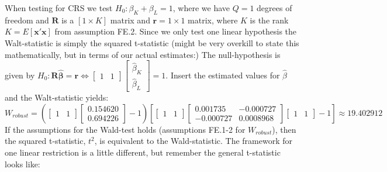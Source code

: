 When testing for CRS we test $H_0:\beta_K+\beta_L=1$, where we have $Q=1$ degrees of freedom and  $\mathbf{R}$ is a $[1 \times K]$ matrix and $\textbf{r}=1 \times 1$ matrix, where $K$ is the rank $K=E[\textbf{x}'\textbf{x}]$  from assumption FE.2. Since we only test one linear hypothesis the Walt-statistic is simply the squared t-statistic (might be very overkill to state this mathematically, but in terms of our actual estimates:)
The null-hypothesis is given by  $H_0: \mathbf{R}\boldsymbol{\hat{\beta}}=\mathbf{r}\Leftrightarrow \begin{bmatrix}1&1 \end{bmatrix} \begin{bmatrix}\hat{\beta}_K\\ \hat{\beta}_L \end{bmatrix}=1$. Insert the estimated values for $\hat{\beta}$ and the Walt-statistic yields:
\begin{equation*}
    W_{robust}= (\begin{bmatrix}1&1 \end{bmatrix} 
    \begin{bmatrix} 0.154620 \\ 0.694226 \end{bmatrix}-1)[\begin{bmatrix}1&1 \end{bmatrix}
    \begin{bmatrix}
        0.001735 & -0.000727 \\ 
        -0.000727 & 0.0008968
    \end{bmatrix} \begin{bmatrix}1&1 \end{bmatrix}-1]\approx 19.402912
\end{equation*}
If the assumptions for the Wald-test holds (assumptions FE.1-2 for $W_{robust}$), then the squared t-statistic, $t^2$, is equivalent to the Wald-statistic. The framework for one linear restriction is a little different, but remember the general t-statistic looks like:

